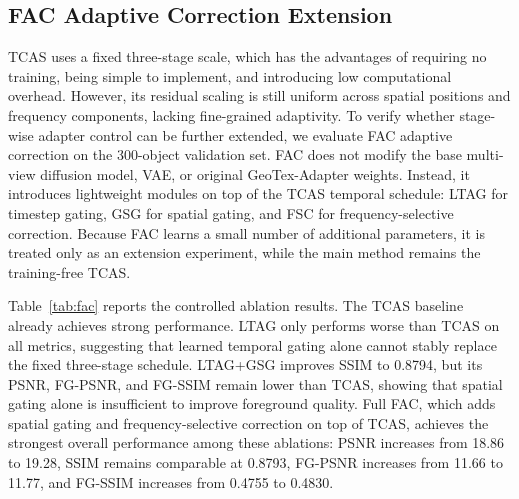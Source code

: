 \documentclass[times,twocolumn,final]{elsarticle}
\begin{document}
\FloatBarrier

\subsection{FAC Adaptive Correction Extension}
\label{subsec:facexp}

TCAS uses a fixed three-stage scale, which has the advantages of requiring no training, being simple to implement, and introducing low computational overhead. However, its residual scaling is still uniform across spatial positions and frequency components, lacking fine-grained adaptivity. To verify whether stage-wise adapter control can be further extended, we evaluate FAC adaptive correction on the 300-object validation set. FAC does not modify the base multi-view diffusion model, VAE, or original GeoTex-Adapter weights. Instead, it introduces lightweight modules on top of the TCAS temporal schedule: LTAG for timestep gating, GSG for spatial gating, and FSC for frequency-selective correction. Because FAC learns a small number of additional parameters, it is treated only as an extension experiment, while the main method remains the training-free TCAS.

\begin{table}[h!]
\centering
\caption{Ablation results of the FAC adaptive correction extension on the 300-object validation set. Full FAC adds spatial gating and frequency-selective correction on top of the TCAS temporal schedule.}
\label{tab:fac}
\end{table}


Table~\ref{tab:fac} reports the controlled ablation results. The TCAS baseline already achieves strong performance. LTAG only performs worse than TCAS on all metrics, suggesting that learned temporal gating alone cannot stably replace the fixed three-stage schedule. LTAG+GSG improves SSIM to 0.8794, but its PSNR, FG-PSNR, and FG-SSIM remain lower than TCAS, showing that spatial gating alone is insufficient to improve foreground quality. Full FAC, which adds spatial gating and frequency-selective correction on top of TCAS, achieves the strongest overall performance among these ablations: PSNR increases from 18.86 to 19.28, SSIM remains comparable at 0.8793, FG-PSNR increases from 11.66 to 11.77, and FG-SSIM increases from 0.4755 to 0.4830.
\end{document}
